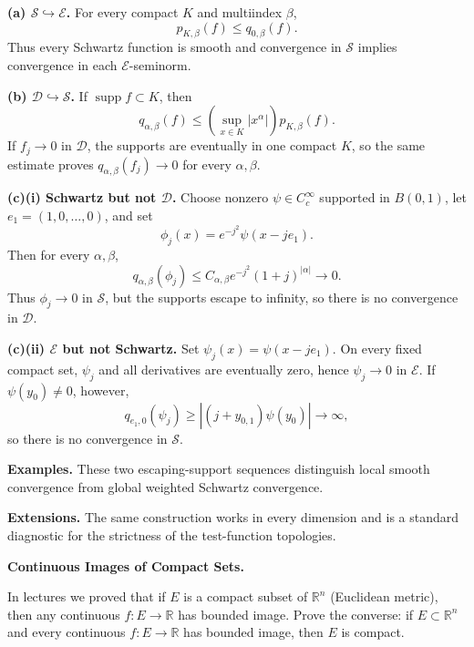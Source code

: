 \begin{solution}

\par\smallskip\noindent\textbf{(a) \(\mathcal S\hookrightarrow\mathcal E\).}
For every compact \(K\) and multiindex \(\beta\),
\[
p_{K,\beta}(f)
\le
q_{0,\beta}(f).
\]
Thus every Schwartz function is smooth and convergence in \(\mathcal S\)
implies convergence in each \(\mathcal E\)-seminorm.

\par\smallskip\noindent\textbf{(b) \(\mathcal D\hookrightarrow\mathcal S\).}
If \(\operatorname{supp}f\subset K\), then
\[
q_{\alpha,\beta}(f)
\le
\left(\sup_{x\in K}|x^\alpha|\right)p_{K,\beta}(f).
\]
If \(f_j\to0\) in \(\mathcal D\), the supports are eventually in one
compact \(K\), so the same estimate proves
\(q_{\alpha,\beta}(f_j)\to0\) for every \(\alpha,\beta\).

\par\smallskip\noindent\textbf{(c)(i) Schwartz but not \(\mathcal D\).}
Choose nonzero \(\psi\in C_c^\infty\) supported in \(B(0,1)\), let
\(e_1=(1,0,\dots,0)\), and set
\[
\phi_j(x)=e^{-j^2}\psi(x-je_1).
\]
Then for every \(\alpha,\beta\),
\[
q_{\alpha,\beta}(\phi_j)
\le
C_{\alpha,\beta}e^{-j^2}(1+j)^{|\alpha|}\to0.
\]
Thus \(\phi_j\to0\) in \(\mathcal S\), but the supports escape to infinity,
so there is no convergence in \(\mathcal D\).

\par\smallskip\noindent\textbf{(c)(ii) \(\mathcal E\) but not Schwartz.}
Set \(\psi_j(x)=\psi(x-je_1)\). On every fixed compact set, \(\psi_j\) and
all derivatives are eventually zero, hence \(\psi_j\to0\) in \(\mathcal E\).
If \(\psi(y_0)\ne0\), however,
\[
q_{e_1,0}(\psi_j)
\ge
|(j+y_{0,1})\psi(y_0)|\to\infty,
\]
so there is no convergence in \(\mathcal S\).

\medskip
\noindent\textbf{Examples.}
These two escaping-support sequences distinguish local smooth convergence
from global weighted Schwartz convergence.

\medskip
\noindent\textbf{Extensions.}
The same construction works in every dimension and is a standard diagnostic
for the strictness of the test-function topologies.
\end{solution}


\begin{problem}[CP-II-0130]
\label{prob:cp-ii-0130}
\textbf{Continuous Images of Compact Sets.}

\hspace*{1.5em}In lectures we proved that if $E$ is a compact subset of $\mathbb{R}^n$ (Euclidean metric), then any
continuous $f:E\to\mathbb{R}$ has bounded image. Prove the converse: if $E\subset\mathbb{R}^n$
and every continuous $f:E\to\mathbb{R}$ has bounded image, then $E$ is compact.
\end{problem}

